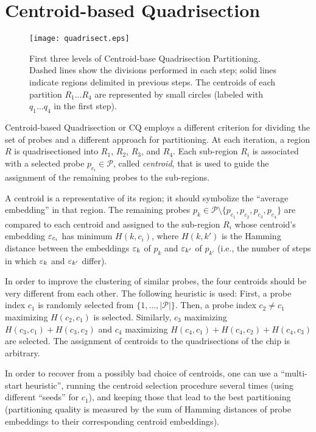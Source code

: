 \section{Centroid-based Quadrisection}
\label{sec:part_cq}

\begin{figure}\centering
\texttt{[image: quadrisect.eps]}
\caption{\label{fig:quadrisect}%
  First three levels of Centroid-base Quadrisection Partitioning. Dashed lines
  show the divisions performed in each step; solid lines indicate regions
  delimited in previous steps. The centroids of each partition $R_1 \dots R_4$
  are represented by small circles (labeled with $q_1 \dots q_4$ in the first
  step).}
\end{figure}

Centroid-based Quadrisection or CQ \citep{Kahng2003a} employs a
different criterion for dividing the set of probes and a different
approach for partitioning. At each iteration, a region $R$ is
quadrisectioned into $R_1$, $R_2$, $R_3$, and $R_4$. Each sub-region
$R_i$ is associated with a selected probe $p_{c_i}\in \mathcal{P}$,
called \emph{centroid}, that is used to guide the assignment of the
remaining probes to the sub-regions.

A centroid is a representative of its region; it should symbolize the
``average embedding'' in that region. The remaining probes $p_k \in
\mathcal{P} \setminus \{p_{c_1},p_{c_2},p_{c_3},p_{c_4}\}$ are
compared to each centroid and assigned to the sub-region $R_i$ whose
centroid's embedding $\varepsilon_{c_i}$ has minimum $H(k,c_i)$, where
$H(k,k')$ is the Hamming distance between the embeddings $\varepsilon_k$ of
$p_k$ and $\varepsilon_{k'}$ of $p_{k'}$ (i.e., the number of steps in which
$\varepsilon_k$ and $\varepsilon_{k'}$ differ).

In order to improve the clustering of similar probes, the four
centroids should be very different from each other. The following
heuristic is used: First, a probe index $c_1$ is randomly selected
from $\{1,\dots,|\mathcal{P}|\}$.  Then, a probe index $c_2\neq c_1$
maximizing $H(c_2,c_1)$ is selected.  Similarly, $c_3$ maximizing
$H(c_3,c_1) + H(c_3,c_2)$ and $c_4$ maximizing $H(c_4,c_1) +
H(c_4,c_2) + H(c_4,c_3)$ are selected.  The assignment of centroids to
the quadrisections of the chip is arbitrary.

In order to recover from a possibly bad choice of centroids, one can
use a ``multi-start heuristic'', running the centroid selection
procedure several times (using different ``seeds'' for $c_1$), and
keeping those that lead to the best partitioning (partitioning quality
is measured by the sum of Hamming distances of probe embeddings to
their corresponding centroid embeddings).

